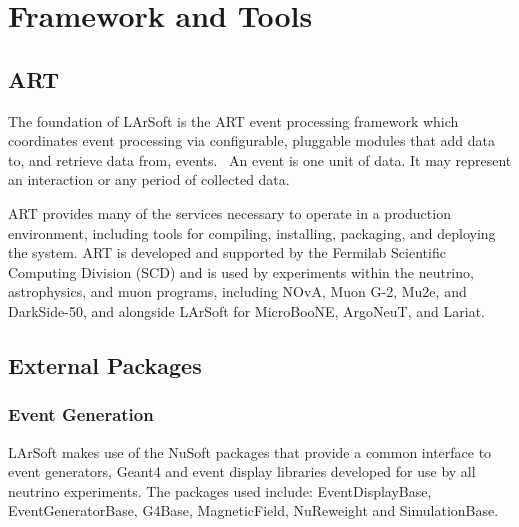 \documentclass[12pt]{elsarticle}
\newcommand{\larsoft}{LArSoft }
\begin{document}
\hspace*{2cm}
\begin{figure}[h]
\centering
\label{bubble}
\end{figure}

\section{Framework and Tools}
\subsection{ART}
The foundation of \larsoft is the ART event processing framework which coordinates event processing via configurable, pluggable modules that add data to, and retrieve data from, events.~\cite{art-ref}  An event is one unit of data. It may represent an interaction or any period of collected data.

ART provides many of the services necessary to operate in a production environment, including tools for compiling, installing, packaging, and deploying the system.  ART is developed and supported by the Fermilab Scientific Computing Division (SCD) and is used by experiments within the neutrino, astrophysics, and muon programs, including NOvA, Muon G-2, Mu2e, and DarkSide-50, and alongside \larsoft for MicroBooNE, ArgoNeuT, and Lariat.

\subsection{External Packages}
\subsubsection{Event Generation}
\larsoft makes use of the NuSoft packages that provide a common interface to event generators, Geant4 and event display libraries developed for use by all neutrino experiments. The packages used include: EventDisplayBase, EventGeneratorBase, G4Base, MagneticField, NuReweight and SimulationBase.
\end{document}
